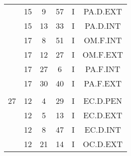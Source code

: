 \documentclass[12pt, a4paper]{article}
\begin{document}
\begin{multicols}{3}
{\begin{tabular}{c c c c c c}
	 	 	 	 & 15 & 9 & 57 & I & PA.D.EXT\\%
	 	 	 	 & 15 & 13 & 33 & I & PA.D.INT\\%
	 	 	 	 & 17 & 8 & 51 & I & OM.F.INT\\%
	 	 	 	 & 17 & 12 & 27 & I & OM.F.EXT\\%
	 	 	 	 & 17 & 27 & 6 & I & PA.F.INT\\%
	 	 	 	 & 17 & 30 & 40 & I & PA.F.EXT\\%
	 	 	 	 & & & & & \\%
	 	 	 	27 & 12 & 4 & 29 & I & EC.D.PEN\\%
	 	 	 	 & 12 & 5 & 13 & I & EC.D.EXT\\%
	 	 	 	 & 12 & 8 & 47 & I & EC.D.INT\\%
	 	 	 	 & 12 & 21 & 14 & I & OC.D.EXT\\%
	 	 \end{tabular}
 	}
\end{multicols}
\end{document}

